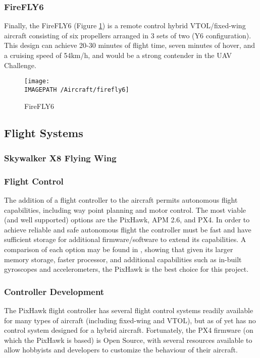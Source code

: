 \subsubsection*{FireFLY6}
Finally, the FireFLY6\cite{ref:firefly6} (Figure \ref{fig:firefly6}) is a remote control hybrid VTOL/fixed-wing aircraft consisting of six propellers arranged in 3 sets of two (Y6 configuration). This design can achieve 20-30 minutes of flight time, seven minutes of hover, and a cruising speed of 54km/h, and would be a strong contender in the UAV Challenge.

\begin{figure}[!h]
	\centering
	\texttt{[image: \\IMAGEPATH /Aircraft/firefly6]}
	\caption{FireFLY6}
	\label{fig:firefly6}
\end{figure}

\subsection{Flight Systems}

\subsubsection{Skywalker X8 Flying Wing}


\subsubsection*{Flight Control}
The addition of a flight controller to the aircraft permits autonomous flight capabilities, including way point planning and motor control. The most viable (and well supported) options are the PixHawk\cite{ref:pixhawk}, APM 2.6\cite{ref:ardupilot}, and PX4\cite{ref:px4}. In order to achieve reliable and safe autonomous flight the controller must be fast and have sufficient storage for additional firmware/software to extend its capabilities. A comparison of each option may be found in \cite{ref:controller_comparison}, showing that given its larger memory storage, faster processor, and additional capabilities such as in-built gyroscopes and accelerometers, the PixHawk is the best choice for this project.

\subsubsection*{Controller Development}
The PixHawk flight controller has several flight control systems readily available for many types of aircraft (including fixed-wing and VTOL), but as of yet has no control system designed for a hybrid aircraft. Fortunately, the PX4 firmware (on which the PixHawk is based) is Open Source\cite{ref:ardupilotgit}, with several resources available\cite{ref:firmware1,ref:firmware2} to allow hobbyists and developers to customize the behaviour of their aircraft.

